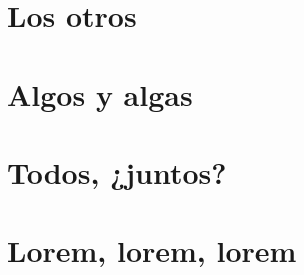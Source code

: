 \section{Los otros}

\section{Algos y algas}

\section{Todos, ¿juntos?}


\section{Lorem, lorem, lorem}

\lipsum